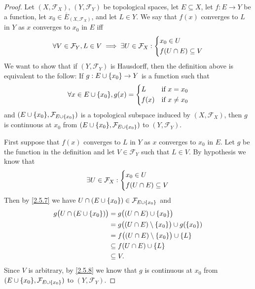 \begin{proof}
  Let \((X, \mathcal{F}_X)\), \((Y, \mathcal{F}_Y)\) be topological spaces, let \(E \subseteq X\), let \(f : E \to Y\) be a function, let \(x_0 \in \overline{E}_{(X, \mathcal{F}_X)}\), and let \(L \in Y\).
  We say that \(f(x)\) converges to \(L\) in \(Y\) as \(x\) converges to \(x_0\) in \(E\) iff
  \[
    \forall V \in \mathcal{F}_Y, L \in V \implies \exists U \in \mathcal{F}_X : \begin{dcases}
      x_0 \in U \\
      f(U \cap E) \subseteq V
    \end{dcases}
  \]
  We want to show that if \((Y, \mathcal{F}_Y)\) is Hausdorff, then the definition above is equivalent to the follow:
  If \(g : E \cup \left\lbrace x_0\right\rbrace \to Y\) is a function such that
  \[
    \forall x \in E \cup \set{x_0}, g(x) = \begin{dcases}
      L    & \text{if } x = x_0    \\
      f(x) & \text{if } x \neq x_0
    \end{dcases}
  \]
  and \((E \cup \set{x_0}, \mathcal{F}_{E \cup \set{x_0}})\) is a topological subspace induced by \((X, \mathcal{F}_X)\), then \(g\) is continuous at \(x_0\) from \((E \cup \set{x_0}, \mathcal{F}_{E \cup \set{x_0}})\) to \((Y, \mathcal{F}_Y)\).

  First suppose that \(f(x)\) converges to \(L\) in \(Y\) as \(x\) converges to \(x_0\) in \(E\).
  Let \(g\) be the function in the definition and let \(V \in \mathcal{F}_Y\) such that \(L \in V\).
  By hypothesis we know that
  \[
    \exists U \in \mathcal{F}_X : \begin{dcases}
      x_0 \in U \\
      f(U \cap E) \subseteq V
    \end{dcases}
  \]
  Then by \cref{2.5.7} we have \(U \cap (E \cup \left\lbrace x_0\right\rbrace) \in \mathcal{F}_{E \cup \left\lbrace x_0\right\rbrace}\) and
  \begin{align*}
    g\big(U \cap (E \cup \set{x_0})\big) & = g\big((U \cap E) \cup \set{x_0}\big)                        \\
                                         & = g\big((U \cap E) \setminus \set{x_0}\big) \cup g(\set{x_0}) \\
                                         & = f\big((U \cap E) \setminus \set{x_0}\big) \cup \set{L}      \\
                                         & \subseteq f(U \cap E) \cup \set{L}                            \\
                                         & \subseteq V.
  \end{align*}
  Since \(V\) is arbitrary, by \cref{2.5.8} we know that \(g\) is continuous at \(x_0\) from \((E \cup \set{x_0}, \mathcal{F}_{E \cup \set{x_0}})\) to \((Y, \mathcal{F}_Y)\).


\end{proof}
